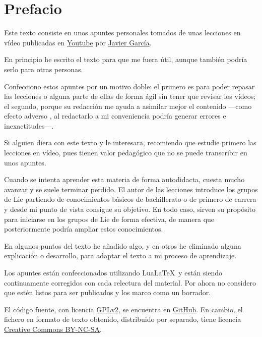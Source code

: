 %

\chapter{Prefacio}
Este texto consiste en unos apuntes personales tomados de unas lecciones en vídeo
publicadas en
\href{%
  https://www.youtube.com/watch?v=4NE-KNwHKSI\&list=PLAnA8FVrBl8DTFTMP8kXbDnRJHQKqfjaw
}
{Youtube}
por \href{https://www.patreon.com/JavierGarcia/}{Javier García}.

En principio he escrito el texto para que me fuera útil, aunque también podría serlo
para otras personas.

Confecciono estos apuntes por un motivo doble: el primero es para poder repasar las
lecciones o alguna parte de ellas de forma ágil sin tener que revisar los vídeos;
el segundo, porque su redacción me ayuda a asimilar mejor el contenido ---como efecto
adverso , al redactarlo a mi conveniencia podría generar errores e inexactitudes---.

Si alguien diera con este texto y le interesara, recomiendo que estudie primero las
lecciones en vídeo, pues tienen valor pedagógico que no se puede transcribir en unos
apuntes.

Cuando se intenta aprender esta materia de forma autodidacta, cuesta mucho avanzar y se
suele terminar perdido. El autor de las lecciones introduce los grupos de Lie partiendo
de conocimientos básicos de bachillerato o de primero de carrera y desde mi punto de
vista consigue su objetivo. En todo caso, sirven su propósito para iniciarse en los
grupos de Lie de forma efectiva, de manera que posteriormente podría ampliar estos
conocimientos.

En algunos puntos del texto he añadido algo, y en otros he eliminado alguna explicación
o desarrollo, para adaptar el texto a mi proceso de aprendizaje.

Los apuntes están confeccionados utilizando Lua\LaTeX\ y están siendo continuamente
corregidos con cada relectura del material. Por ahora no considero que estén listos para
ser publicados y los marco como un borrador.

El código fuente, con licencia
\href{https://www.gnu.org/licenses/old-licenses/gpl-2.0.html#SEC1}{GPLv2}, se encuentra
en \href{https://github.com/janr57/gruposlie}{GitHub}.
En cambio, el fichero en formato de texto obtenido, distribuido por separado, tiene
licencia
\href{https://creativecommons.org/licenses/by-nc-sa/4.0/}{Creative Commons BY-NC-SA}.



 
